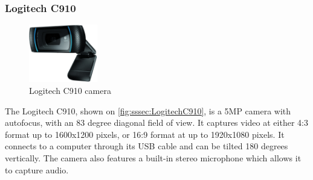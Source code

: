 \subsubsection{Logitech C910}
\begin{figure}[H]
  \centering
  \includegraphics[width=3cm]{images/techAnalysis/LogitechC910.jpg}
  \caption{Logitech C910 camera \cite{Logitech-figure-C910}}\label{fig:sssec:LogitechC910}
\end{figure}
The Logitech C910, shown on \autoref{fig:sssec:LogitechC910}, is a 5MP camera with autofocus, with an 83 degree diagonal field of view. It captures video at either 4:3 format up to 1600x1200 pixels, or 16:9 format at up to 1920x1080 pixels. It connects to a computer through its USB cable and can be tilted 180 degrees vertically. The camera also features a built-in stereo microphone which allows it to capture audio. \cite{logitech_logitech_spec}
